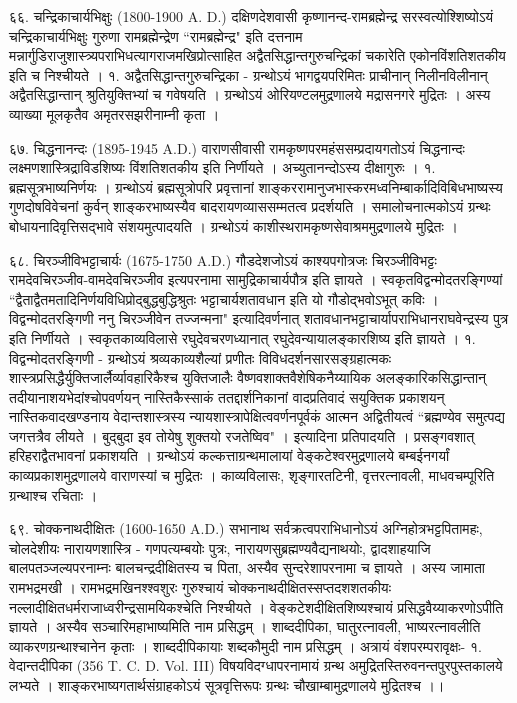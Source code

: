६६. चन्द्रिकाचार्यभिक्षुः (1800-1900 A. D.)
दक्षिणदेशवासी कृष्णानन्द-रामब्रह्मेन्द्र सरस्वत्योश्शिष्योऽयं चन्द्रिकाचार्यभिक्षुः गुरुणा रामब्रह्मेन्द्रेण ``रामब्रह्मेन्द्र" इति दत्तनाम मन्नार्गुडिराजुशास्त्र्यपराभिधत्यागराजमखिप्रोत्साहित अद्वैतसिद्धान्तगुरुचन्द्रिकां चकारेति एकोनविंशतिशतकीय इति च निश्चीयते ।
१. अद्वैतसिद्धान्तगुरुचन्द्रिका - 
ग्रन्थोऽयं भागद्वयपरिमितः प्राचीनान् निलीनविलीनान् अद्वैतसिद्धान्तान् श्रुतियुक्तिभ्यां च गवेषयति । ग्रन्थोऽयं ओरियण्टलमुद्रणालये मद्रासनगरे मुद्रितः । अस्य व्याख्या मूलकृतैव अमृतरसझरीनाम्नी कृता ।

६७. चिद्धनानन्दः (1895-1945 A.D.)
वाराणसीवासी रामकृष्णपरमहंससम्प्रदायगतोऽयं चिद्धनान्दः लक्ष्मणशास्त्रिद्राविडशिष्यः विंशतिशतकीय इति निर्णीयते । अच्युतानन्दोऽस्य दीक्षागुरुः ।
१. ब्रह्मसूत्रभाष्यनिर्णयः ।
ग्रन्थोऽयं ब्रह्मसूत्रोपरि प्रवृत्तानां शाङ्कररामानुजभास्करमध्वनिम्बार्कादिविबिधभाष्यस्य गुणदोषविवेचनां कुर्वन् शाङ्करभाष्यस्यैव बादरायणव्याससम्मतत्व प्रदर्शयति । समालोचनात्मकोऽयं ग्रन्थः बोधायनादिवृत्तिसद्भावे संशयमुत्पादयति । ग्रन्थोऽयं काशीस्थरामकृष्णसेवाश्रममुद्रणालये मुद्रितः ।

६८. चिरञ्जीविभट्टाचार्यः (1675-1750 A.D.)
गौडदेशजोऽयं काश्यपगोत्रजः चिरञ्जीविभट्टः रामदेवचिरञ्जीव-वामदेवचिरञ्जीव इत्यपरनामा सामुद्रिकाचार्यपौत्र इति ज्ञायते । स्वकृतविद्वन्मोदतरङ्गिण्यां 
``द्वैताद्वैतमतादिनिर्णयविधिप्रोद्बुद्धबुद्धिश्रुतः
भट्टाचार्यशतावधान इति यो गौडोद्भवोऽभूत् कविः ।
विद्वन्मोदतरङ्गिणी ननु चिरञ्जीवेन तज्जन्मना"
इत्यादिवर्णनात् शतावधानभट्टाचार्यापराभिधानराघवेन्द्रस्य पुत्र इति निर्णीयते । स्वकृतकाव्यविलासे रघुदेवचरणध्यानात् रघुदेवन्यायालङ्कारशिष्य इति ज्ञायते ।
१. विद्वन्मोदतरङ्गिणी - 
ग्रन्थोऽयं श्रव्यकाव्यशैल्यां प्रणीतः विविधदर्शनसारसङ्ग्रहात्मकः शास्त्रप्रसिद्धैर्युक्तिजार्लैर्व्यावहारिकैश्च युक्तिजालैः वैष्णवशाक्तवैशेषिकनैय्यायिक अलङ्कारिकसिद्धान्तान् तदीयानाशयभेदांश्चोपवर्णयन् नास्तिकैस्साकं ततद्दार्शनिकानां वादप्रतिवादं सयुक्तिक प्रकाशयन् नास्तिकवादखण्डनाय वेदान्तशास्त्रस्य न्यायशास्त्रापेक्षित्ववर्णनपूर्वकं आत्मन अद्वितीयत्वं 
``ब्रह्मण्येव समुत्पद्य जगत्तत्रैव लीयते ।
बुद्बुदा इव तोयेषु शुक्तयो रजतेष्विव" ।
इत्यादिना प्रतिपादयति । प्रसङ्गवशात् हरिहराद्वैतभावनां प्रकाशयति । ग्रन्थोऽयं कल्कत्ताग्रन्थमालायां वेङ्कटेश्वरमुद्रणालये बम्बईनगर्यां काव्यप्रकाशमुद्रणालये वाराणस्यां च मुद्रितः ।
काव्यविलासः, शृङ्गारतटिनी, वृत्तरत्नावली, माधवचम्पूरिति ग्रन्थाश्च रचिताः ।

६९. चोक्कनाथदीक्षितः (1600-1650 A.D.)
सभानाथ सर्वक्रत्वपराभिधानोऽयं अग्निहोत्रभट्टपितामहः, चोलदेशीयः नारायणशास्त्रि - गणपत्यम्बयोः पुत्रः, नारायणसुब्रह्मण्यवैद्यनाथयोः, द्वादशाहयाजि बालपतञ्जल्यपरनाम्नः बालचन्द्रदीक्षितस्य च पिता, अस्यैव सुन्दरेशापरनामा च ज्ञायते । अस्य जामाता रामभद्रमखी । रामभद्रमखिनश्श्वशुरः गुरुश्चायं चोक्कनाथदीक्षितस्सप्तदशशतकीयः नल्लादीक्षितधर्मराजाध्वरीन्द्रसामयिकश्चेति निश्चीयते । वेङ्कटेशदीक्षितशिष्यश्चायं प्रसिद्धवैय्याकरणोऽपीति ज्ञायते । अस्यैव सञ्चारिमहाभाष्यमिति नाम प्रसिद्धम् ।
शाब्ददीपिका, घातुरत्नावली, भाष्यरत्नावलीति व्याकरणग्रन्थाश्चानेन कृताः । शाब्ददीपिकायाः शब्दकौमुदी नाम प्रसिद्धम् । अत्रायं वंशपरम्परावृक्षः-
१. वेदान्तदीपिका (356 T. C. D. Vol. III)
विषयविदग्धापरनामायं ग्रन्थ अमुद्रितस्तिरुवनन्तपुरपुस्तकालये लभ्यते । शाङ्करभाष्यगतार्थसंग्राहकोऽयं सूत्रवृत्तिरूपः ग्रन्थः चौखाम्बामुद्रणालये मुद्रितश्च ।।

